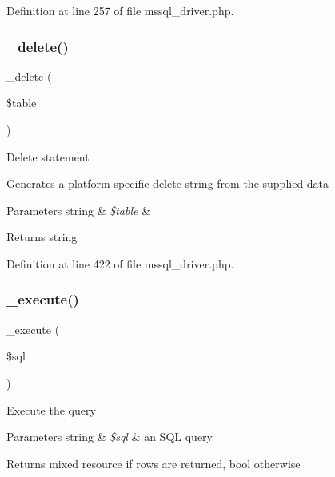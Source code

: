 Definition at line 257 of file mssql\+\_\+driver.\+php.

\mbox{\label{class_c_i___d_b__mssql__driver_a133ea8446ded52589bd22cc9163d0896}} 
\subsubsection{\texorpdfstring{\_delete()}{\_delete()}}
{\footnotesize\ttfamily \+\_\+delete (\begin{DoxyParamCaption}\item[{}]{\$table }\end{DoxyParamCaption})\hspace{0.3cm}{\ttfamily [protected]}}

Delete statement

Generates a platform-\/specific delete string from the supplied data


\begin{DoxyParams}[1]{Parameters}
string & {\em \$table} & \\
\hline
\end{DoxyParams}
\begin{DoxyReturn}{Returns}
string 
\end{DoxyReturn}


Definition at line 422 of file mssql\+\_\+driver.\+php.

\mbox{\label{class_c_i___d_b__mssql__driver_a114ab675d89bf8324a41785fb475e86d}} 
\subsubsection{\texorpdfstring{\_execute()}{\_execute()}}
{\footnotesize\ttfamily \+\_\+execute (\begin{DoxyParamCaption}\item[{}]{\$sql }\end{DoxyParamCaption})\hspace{0.3cm}{\ttfamily [protected]}}

Execute the query


\begin{DoxyParams}[1]{Parameters}
string & {\em \$sql} & an S\+QL query \\
\hline
\end{DoxyParams}
\begin{DoxyReturn}{Returns}
mixed resource if rows are returned, bool otherwise 
\end{DoxyReturn}


